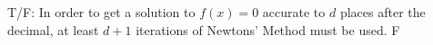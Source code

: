 {T/F: In order to get a solution to $f(x)=0$ accurate to $d$ places after the decimal, at least $d+1$ iterations of Newtons' Method must be used.
}
{F
}
